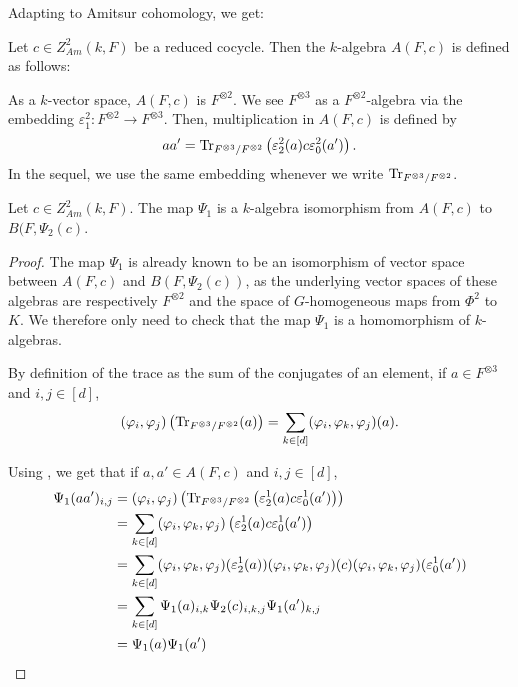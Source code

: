     Adapting  to Amitsur cohomology, we get:
    \begin{definition}\label{def:AmitsurCSA}
        Let \(c \in Z_{Am}^2(k,F)\) be a reduced cocycle. Then the \(k\)-algebra \(A(F,c)\) is defined as follows:

        As a \(k\)-vector space, \(A(F,c)\) is \(F^{\otimes 2}\). We see \(F^{\otimes 3}\) as a \(F^{\otimes 2}\)-algebra via the embedding \(\varepsilon_1^2\colon F^{\otimes 2} \to F^{\otimes 3}\). Then, multiplication in \(A(F,c)\) is defined by
        \[a a' = \operatorname{Tr}_{F^{\otimes 3}/F^{\otimes 2}}\left(\varepsilon_2^2(a)c\varepsilon_0^2(a')\right).\]
        In the sequel, we use the same embedding whenever we write \(\operatorname{Tr}_{F^{\otimes 3}/F^{\otimes 2}}\).
    \end{definition}

    \begin{prop}
        Let \(c \in Z_{Am}^2(k,F)\). The map \(\Psi_1\) is a \(k\)-algebra isomorphism from \(A(F,c)\) to \(B(F,\Psi_2(c)\).
    \end{prop}

    \begin{proof}
        The map \(\Psi_1\) is already known to be an isomorphism of vector space between \(A(F,c)\) and \(B(F,\Psi_2(c))\), as the underlying vector spaces of these algebras are respectively \(F^{\otimes 2}\) and the space of \(G\)-homogeneous maps from \(\Phi^2\) to \(K\). We therefore only need to check that the map \(\Psi_1\) is a homomorphism of \(k\)-algebras.
        
        By definition of the trace as the sum of the conjugates of an element, if \(a \in F^{\otimes 3}\) and \(i,j \in [d]\),
        \[(\varphi_i,\varphi_j)\left(\operatorname{Tr}_{F^{\otimes 3}/F^{\otimes 2}}(a)\right) = \sum_{k \in [d]} (\varphi_i,\varphi_k,\varphi_j)(a).\]

        Using , we get that if \(a,a' \in A(F,c)\) and \(i,j \in [d]\),
        \begin{align*}
            \Psi_1(aa')_{i,j} &= (\varphi_i,\varphi_j)\left( \operatorname{Tr}_{F^{\otimes 3}/F^{\otimes 2}}\left(\varepsilon_2^1(a)c\varepsilon_0^1(a')\right)\right)\\
            &= \sum_{k \in [d]}(\varphi_i,\varphi_k,\varphi_j)\left(\varepsilon_2^1(a)c\varepsilon_0^1(a')\right) \\
            &= \sum_{k \in [d]}(\varphi_i,\varphi_k,\varphi_j)(\varepsilon_2^1(a))(\varphi_i,\varphi_k,\varphi_j)(c)(\varphi_i,\varphi_k,\varphi_j)(\varepsilon_0^1(a')) \\
            &= \sum_{k \in [d]} \Psi_1(a)_{i,k} \Psi_2(c)_{i,k,j} \Psi_1(a')_{k,j} \\
            &= \Psi_1(a) \Psi_1(a')
        \end{align*}
    \end{proof}
    
